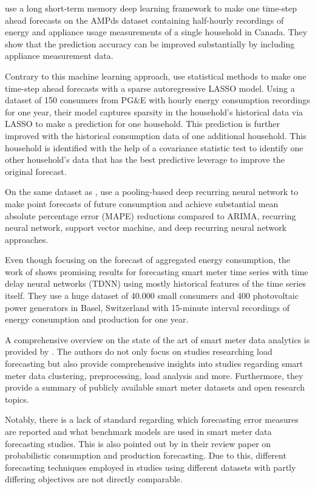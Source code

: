 \citet{Kong:2018} use a long short-term memory deep learning framework to make one time-step ahead forecasts on the AMPds dataset containing half-hourly recordings of energy and appliance usage measurements of a single household in Canada. They show that the prediction accuracy can be improved substantially by including appliance measurement data.

Contrary to this machine learning approach, \citet{Li:2017} use statistical methods to make one time-step ahead forecasts with a sparse autoregressive LASSO model. Using a dataset of 150 consumers from PG\&E with hourly energy consumption recordings for one year, their model captures sparsity in the household’s historical data via LASSO to make a prediction for one household. This prediction is further improved with the historical consumption data of one additional household. This household is identified with the help of a covariance statistic test to identify one other household's data that has the best predictive leverage to improve the original forecast.

On the same dataset as \citet{Arora:2016}, \citet{Shi:2017} use a pooling-based deep recurring neural network to make point forecasts of future consumption and achieve substantial mean absolute percentage error (MAPE) reductions compared to ARIMA, recurring neural network, support vector machine, and deep recurring neural network approaches.

Even though focusing on the forecast of aggregated energy consumption, the work of \citet{Zufferey:2017} shows promising results for forecasting smart meter time series with time delay neural networks (TDNN) using mostly historical features of the time series itself. They use a huge dataset of 40.000 small consumers and 400 photovoltaic power generators in Basel, Switzerland with 15-minute interval recordings of energy consumption and production for one year.

A comprehensive overview on the state of the art of smart meter data analytics is provided by \citet{Wang:2018}. The authors do not only focus on studies researching load forecasting but also provide comprehensive insights into studies regarding smart meter data clustering, preprocessing, load analysis and more. Furthermore, they provide a summary of publicly available smart meter datasets and open research topics.

Notably, there is a lack of standard regarding which forecasting error measures are reported and what benchmark models are used in smart meter data forecasting studies. This is also pointed out by \citet{Meer:2018} in their review paper on probabilistic consumption and production forecasting. Due to this, different forecasting techniques employed in studies using different datasets with partly differing objectives are not directly comparable. 

